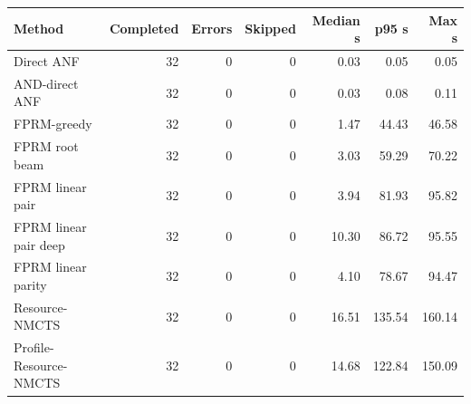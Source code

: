 \begin{tabular}{lrrrrrr}
\toprule
Method & Completed & Errors & Skipped & Median s & p95 s & Max s \\
\midrule
Direct ANF & 32 & 0 & 0 & 0.03 & 0.05 & 0.05 \\
AND-direct ANF & 32 & 0 & 0 & 0.03 & 0.08 & 0.11 \\
FPRM-greedy & 32 & 0 & 0 & 1.47 & 44.43 & 46.58 \\
FPRM root beam & 32 & 0 & 0 & 3.03 & 59.29 & 70.22 \\
FPRM linear pair & 32 & 0 & 0 & 3.94 & 81.93 & 95.82 \\
FPRM linear pair deep & 32 & 0 & 0 & 10.30 & 86.72 & 95.55 \\
FPRM linear parity & 32 & 0 & 0 & 4.10 & 78.67 & 94.47 \\
Resource-NMCTS & 32 & 0 & 0 & 16.51 & 135.54 & 160.14 \\
Profile-Resource-NMCTS & 32 & 0 & 0 & 14.68 & 122.84 & 150.09 \\
\bottomrule
\end{tabular}
